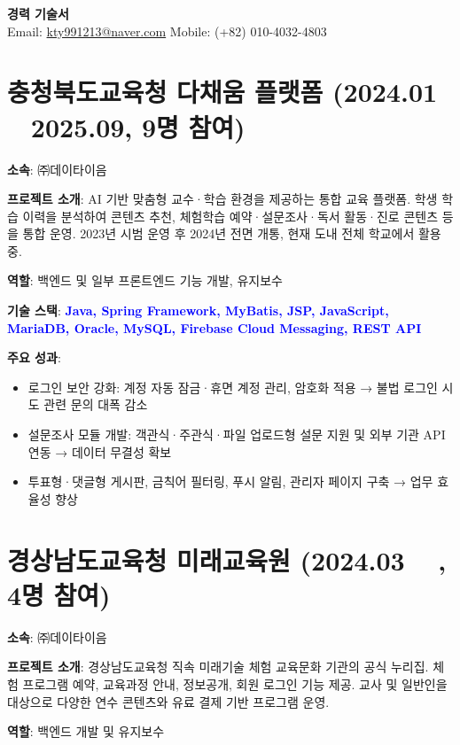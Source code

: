 \documentclass[a4paper,11pt]{article}
\newcommand{\tech}[1]{\textbf{\textcolor{blue}{#1}}}
\begin{document}
\begin{center}
    {\LARGE \textbf{경력 기술서}} \\[6pt]
    Email: \href{mailto:kty991213@naver.com}{kty991213@naver.com} \quad
    Mobile: (+82) 010-4032-4803
\end{center}

\section{충청북도교육청 다채움 플랫폼 (2024.01 ~ 2025.09, 9명 참여)}

\textbf{소속}: ㈜데이타이음

\textbf{프로젝트 소개}:  
AI 기반 맞춤형 교수·학습 환경을 제공하는 통합 교육 플랫폼.  
학생 학습 이력을 분석하여 콘텐츠 추천, 체험학습 예약·설문조사·독서 활동·진로 콘텐츠 등을 통합 운영.  
2023년 시범 운영 후 2024년 전면 개통, 현재 도내 전체 학교에서 활용 중.

\textbf{역할}: 백엔드 및 일부 프론트엔드 기능 개발, 유지보수

\textbf{기술 스택}: \tech{Java, Spring Framework, MyBatis, JSP, JavaScript, MariaDB, Oracle, MySQL, Firebase Cloud Messaging, REST API}

\textbf{주요 성과}:
\begin{itemize}[leftmargin=*]
  \item 로그인 보안 강화: 계정 자동 잠금·휴면 계정 관리, 암호화 적용 → 불법 로그인 시도 관련 문의 대폭 감소
  \item 설문조사 모듈 개발: 객관식·주관식·파일 업로드형 설문 지원 및 외부 기관 API 연동 → 데이터 무결성 확보
  \item 투표형·댓글형 게시판, 금칙어 필터링, 푸시 알림, 관리자 페이지 구축 → 업무 효율성 향상
\end{itemize}

\section{경상남도교육청 미래교육원 (2024.03 ~ , 4명 참여)}

\textbf{소속}: ㈜데이타이음

\textbf{프로젝트 소개}:  
경상남도교육청 직속 미래기술 체험 교육문화 기관의 공식 누리집.  
체험 프로그램 예약, 교육과정 안내, 정보공개, 회원 로그인 기능 제공.  
교사 및 일반인을 대상으로 다양한 연수 콘텐츠와 유료 결제 기반 프로그램 운영.

\textbf{역할}: 백엔드 개발 및 유지보수
\end{document}

